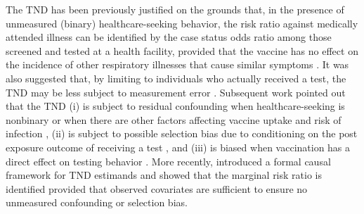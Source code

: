 \documentclass[11pt]{article}
\begin{document}
The TND has been previously justified on the grounds that, in the presence of unmeasured (binary) healthcare-seeking behavior, the risk ratio against medically attended illness can be identified by the case status odds ratio among those screened and tested at a health facility, provided that the vaccine has no effect on the incidence of other respiratory illnesses that cause similar symptoms \cite{jackson_test-negative_2013}. It was also suggested that, by limiting to individuals who actually received a test, the TND may be less subject to measurement error \cite{jackson_test-negative_2013}. Subsequent work pointed out that the TND (i) is subject to residual confounding when healthcare-seeking is nonbinary or when there are other factors affecting vaccine uptake and risk of infection \cite{sullivan_theoretical_2016,lewnard_theoretical_2021,lipsitch_observational_2016}, (ii) is subject to possible selection bias due to conditioning on the post exposure outcome of receiving a test \cite{sullivan_theoretical_2016,lipsitch_observational_2016}, and (iii) is biased when vaccination has a direct effect on testing behavior \cite{foppa_case_2013}. More recently, \textcite{schnitzer_estimands_2022} introduced a formal causal framework for TND estimands and showed that the marginal risk ratio is identified provided that observed covariates are sufficient to ensure no unmeasured confounding or selection bias. 
\end{document}
